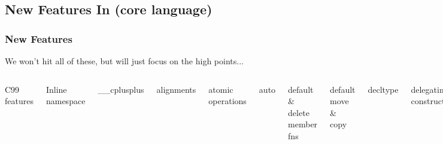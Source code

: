 
\lyxframeend{}\subsection[New Features]{New Features In  (core language)}

\begin{frame}[fragile]
\frametitle{New Features}
We won't hit all of these, but will just focus on the high points...


\begin{columns}[t]

{\scriptsize
C99 features

Inline namespace

\_\_cplusplus

alignments

atomic operations

auto

default \& delete member fns

default move \& copy

decltype

delegating constructors

inherited constructors

override controls: final, override

explicit conversion operators

extended integer types

extern templates

lambdas

null pointer (nullptr)

rvalue references / move ops

}
{\scriptsize
attributes: {[[carries\_dependency]]}, [[noreturn]]

Dynamic Initialization/Destruction with Concurrency

Uniform initialization syntax and semantics

constant expressions (constexpr)

copying and rethrowing exceptions

enum class (scoped and strongly typed enums)

exception propagation (preventing it; noexcept)

in-class member initializers

initializer lists (uniform and general initialization)

local classes as template arguments

long long integers (at least 64 bits)

}
\end{columns}
\end{frame}
